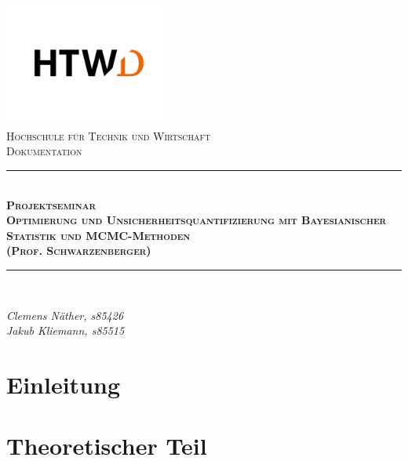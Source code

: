 \documentclass[a4paper,12pt]{article}
\begin{document}
\begin{titlepage}

\begin{center}

\includegraphics[height=4cm]{../images/htwd-logo.jpg}\\[1cm]

\textsc{\LARGE Hochschule für Technik und Wirtschaft}\\[1.5cm]

\textsc{\Large Dokumentation}\\[0.5cm]

\newcommand{\HRule}{\rule{\linewidth}{0.5mm}}
\HRule \\[0.4cm]
{ \huge \bfseries \textsc{Projektseminar}}\\[0.4cm]
{ \huge \bfseries \textsc{Optimierung und Unsicherheitsquantifizierung mit Bayesianischer Statistik und MCMC-Methoden}}\\[0.4cm]
{ \huge \bfseries \textsc{(Prof. Schwarzenberger)}}\\[0.4cm]
\HRule \\[1.5cm]

\begin{minipage}{0.4\textwidth}
\begin{flushleft} \large

\emph{Clemens Näther, s85426}\\
\emph{Jakub Kliemann, s85515}\\

\end{flushleft}
\end{minipage}
\end{center}
\end{titlepage}

\tableofcontents
\newpage

\section{Einleitung}
\newpage

\section{Theoretischer Teil}
\end{document}
